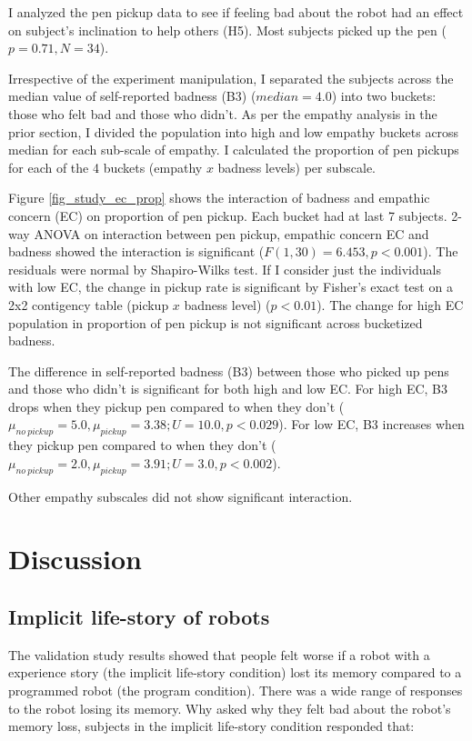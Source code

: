 I analyzed the pen pickup data to see if feeling bad about the robot had an effect on subject's inclination to help others (H5). Most subjects picked up the pen ($p=0.71, N=34$). 

Irrespective of the experiment manipulation, I separated the subjects across the median value of self-reported badness (B3) ($median = 4.0$) into two buckets: those who felt bad and those who didn't. As per the empathy analysis in the prior section, I divided the population into high and low empathy buckets across median for each sub-scale of empathy. I calculated the proportion of pen pickups for each of the 4 buckets (empathy $x$ badness levels) per subscale. 

Figure \ref{fig_study_ec_prop} shows the interaction of badness and empathic concern (EC) on proportion of pen pickup. Each bucket had at last 7 subjects. 2-way ANOVA on interaction between pen pickup, empathic concern EC and badness showed the interaction is significant ($F(1,30)=6.453, p < 0.001$). The residuals were normal by Shapiro-Wilks test. If I consider just the individuals with low EC, the change in pickup rate is significant by Fisher's exact test on a 2x2 contigency table (pickup $x$ badness level) ($p < 0.01$). The change for high EC population in proportion of pen pickup is not significant across bucketized badness.

The difference in self-reported badness (B3) between those who picked up pens and those who didn't is significant for both high and low EC. For high EC, B3 drops when they pickup pen compared to when they don't ($\mu_{no\ pickup}=5.0, \mu_{pickup}=3.38; U=10.0, p < 0.029$). For low EC, B3 increases when they pickup pen compared to when they don't ($\mu_{no\ pickup}=2.0, \mu_{pickup}=3.91; U=3.0, p < 0.002$).


Other empathy subscales did not show significant interaction. 



\section{Discussion}
\subsection{Implicit life-story of robots}

The validation study results showed that people felt worse if a robot with a experience story (the implicit life-story condition) lost its memory compared to a programmed robot (the program condition). There was a wide range of responses to the robot losing its memory. Why asked why they felt bad about the robot's memory loss, subjects in the implicit life-story condition responded that:

